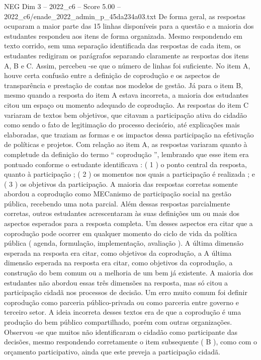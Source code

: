 \begin{textsample}{NEG Dim 3 – 2022\_c6 – Score 5.00 – 2022\_c6/enade\_2022\_admin\_p\_45da234a03.txt}
De forma geral, as respostas ocuparam a maior parte das 15 linhas disponíveis para a questão e a maioria dos estudantes respondeu aos itens de forma organizada.
Mesmo respondendo em texto corrido, sem uma separação identificada das respostas de cada item, os estudantes redigiram os parágrafos separando claramente as respostas dos itens A, B e C.
Assim, percebeu -se que o número de linhas foi suficiente.
No item A, houve certa confusão entre a definição de coprodução e os aspectos de transparência e prestação de contas nos modelos de gestão.
Já para o item B, mesmo quando a resposta do item A estava incorreta, a maioria dos estudantes citou um espaço ou momento adequado de coprodução.
As respostas do item C variaram de textos bem objetivos, que citavam a participação ativa do cidadão como sendo o fato de legitimação do processo decisório, até explicações mais elaboradas, que traziam as formas e os impactos dessa participação na efetivação de políticas e projetos.
Com relação ao item A, as respostas variaram quanto à completude da definição do termo “ coprodução ”, lembrando que esse item era pontuado conforme o estudante identificava : ( 1 ) o ponto central da resposta, quanto à participação ; ( 2 ) os momentos nos quais a participação é realizada ; e ( 3 ) os objetivos da participação.
A maioria das respostas corretas somente abordou a coprodução como MECanismo de participação social na gestão pública, recebendo uma nota parcial.
Além dessas respostas parcialmente corretas, outros estudantes acrescentaram às suas definições um ou mais dos aspectos esperados para a resposta completa.
Um desses aspectos era citar que a coprodução pode ocorrer em qualquer momento do ciclo de vida da política pública ( agenda, formulação, implementação, avaliação ).
A última dimensão esperada na resposta era citar, como objetivos da coprodução, a A última dimensão esperada na resposta era citar, como objetivos da coprodução, a construção do bem comum ou a melhoria de um bem já existente.
A maioria dos estudantes não abordou essas três dimensões na resposta, mas só citou a participação cidadã nos processos de decisão.
Um erro muito comum foi definir coprodução como parceria público-privada ou como parceria entre governo e terceiro setor.
A ideia incorreta desses textos era de que a coprodução é uma produção do bem público compartilhado, porém com outras organizações.
Observou -se que muitos não identificaram o cidadão como participante das decisões, mesmo respondendo corretamente o item subsequente ( B ), como com o orçamento participativo, ainda que este preveja a participação cidadã.

\end{textsample}
